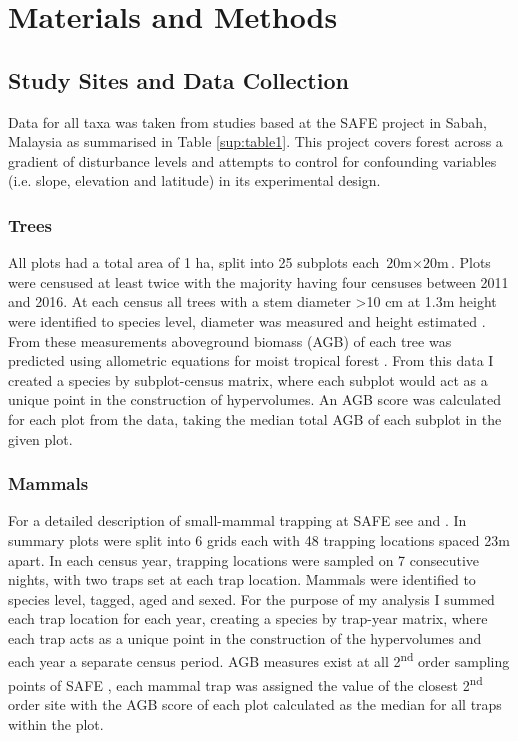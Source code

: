 
\section{Materials and Methods}


\subsection{Study Sites and Data Collection}

	Data for all taxa was taken from studies based at the SAFE project in Sabah, Malaysia \citep{Ewers2011} as summarised in Table \ref{sup:table1}. This project covers forest across a gradient of disturbance levels and attempts to control for confounding variables (i.e. slope, elevation and latitude) in its experimental design. 

	\subsubsection*{Trees}
	
	All plots had a total area of 1 ha, split into 25 subplots each $\text{20m} \times \text{20m}$. Plots were censused at least twice with the majority having four censuses between 2011 and 2016. At each census all trees with a stem diameter >10 cm at 1.3m height were identified to species level, diameter was measured and height estimated \citep{Riutta2018}. From these measurements aboveground biomass (AGB) of each tree was predicted using allometric equations for moist tropical forest \citep{Chave2005}. From this data I created a species by subplot-census matrix, where each subplot would act as a unique point in the construction of hypervolumes. An AGB score was calculated for each plot from the data, taking the median total AGB of each subplot in the given plot.

	\subsubsection*{Mammals}
	
	For a detailed description of small-mammal trapping at SAFE see \cite{Wearn2017} and \cite{Chapman2018}. In summary plots were split into 6 grids each with 48 trapping locations spaced 23m apart. In each census year, trapping locations were sampled on 7 consecutive nights, with two traps set at each trap location. Mammals were identified to species level, tagged, aged and sexed. For the purpose of my analysis I summed each trap location for each year, creating a species by trap-year matrix, where each trap acts as a unique point in the construction of the hypervolumes and each year a separate census period. AGB measures exist at all 2\textsuperscript{nd} order sampling points of SAFE \citep{Pfeifer2016}, each mammal trap was assigned the value of the closest 2\textsuperscript{nd} order site with the AGB score of each plot calculated as the median for all traps within the plot.
	
